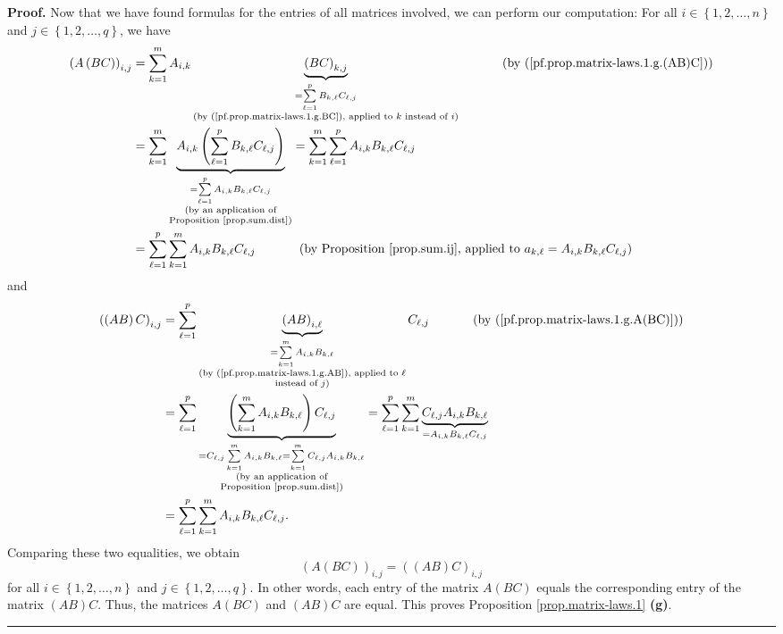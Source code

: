 \documentclass[numbers=enddot,12pt,final,onecolumn,notitlepage]{scrartcl}%
\theoremstyle{definition}
\newenvironment{proof}[1][Proof]{\noindent\textbf{#1.} }{\ \rule{0.5em}{0.5em}}
\let\sumnonlimits\sum
\renewcommand{\sum}{\sumnonlimits\limits}
\begin{document}
\begin{proof}
Now that we have found formulas for the entries of all matrices involved, we
can perform our computation: For all $i\in\left\{  1,2,\ldots,n\right\}  $ and
$j\in\left\{  1,2,\ldots,q\right\}  $, we have%
\begin{align*}
\left(  A\left(  BC\right)  \right)  _{i,j}  &  =\sum_{k=1}^{m}A_{i,k}%
\underbrace{\left(  BC\right)  _{k,j}}_{\substack{=\sum_{\ell=1}^{p}B_{k,\ell
}C_{\ell,j}\\\text{(by (\ref{pf.prop.matrix-laws.1.g.BC}), applied to }k\text{
instead of }i\text{)}}}\ \ \ \ \ \ \ \ \ \ \left(  \text{by
(\ref{pf.prop.matrix-laws.1.g.(AB)C})}\right) \\
&  =\sum_{k=1}^{m}\underbrace{A_{i,k}\left(  \sum_{\ell=1}^{p}B_{k,\ell
}C_{\ell,j}\right)  }_{\substack{=\sum_{\ell=1}^{p}A_{i,k}B_{k,\ell}C_{\ell
,j}\\\text{(by an application of}\\\text{Proposition \ref{prop.sum.dist})}%
}}=\sum_{k=1}^{m}\sum_{\ell=1}^{p}A_{i,k}B_{k,\ell}C_{\ell,j}\\
&  =\sum_{\ell=1}^{p}\sum_{k=1}^{m}A_{i,k}B_{k,\ell}C_{\ell,j}%
\ \ \ \ \ \ \ \ \ \ \left(  \text{by Proposition \ref{prop.sum.ij}, applied to
}a_{k,\ell}=A_{i,k}B_{k,\ell}C_{\ell,j}\right)
\end{align*}
and%
\begin{align*}
\left(  \left(  AB\right)  C\right)  _{i,j}  &  =\sum_{\ell=1}^{p}%
\underbrace{\left(  AB\right)  _{i,\ell}}_{\substack{=\sum_{k=1}^{m}%
A_{i,k}B_{k,\ell}\\\text{(by (\ref{pf.prop.matrix-laws.1.g.AB}), applied to
}\ell\\\text{instead of }j\text{)}}}C_{\ell,j}\ \ \ \ \ \ \ \ \ \ \left(
\text{by (\ref{pf.prop.matrix-laws.1.g.A(BC)})}\right) \\
&  =\sum_{\ell=1}^{p}\underbrace{\left(  \sum_{k=1}^{m}A_{i,k}B_{k,\ell
}\right)  C_{\ell,j}}_{\substack{=C_{\ell,j}\sum_{k=1}^{m}A_{i,k}B_{k,\ell
}=\sum_{k=1}^{m}C_{\ell,j}A_{i,k}B_{k,\ell}\\\text{(by an application
of}\\\text{Proposition \ref{prop.sum.dist})}}}=\sum_{\ell=1}^{p}\sum_{k=1}%
^{m}\underbrace{C_{\ell,j}A_{i,k}B_{k,\ell}}_{=A_{i,k}B_{k,\ell}C_{\ell,j}}\\
&  =\sum_{\ell=1}^{p}\sum_{k=1}^{m}A_{i,k}B_{k,\ell}C_{\ell,j}.
\end{align*}
Comparing these two equalities, we obtain
\[
\left(  A\left(  BC\right)  \right)  _{i,j}=\left(  \left(  AB\right)
C\right)  _{i,j}%
\]
for all $i\in\left\{  1,2,\ldots,n\right\}  $ and $j\in\left\{  1,2,\ldots
,q\right\}  $. In other words, each entry of the matrix $A\left(  BC\right)  $
equals the corresponding entry of the matrix $\left(  AB\right)  C$. Thus, the
matrices $A\left(  BC\right)  $ and $\left(  AB\right)  C$ are equal. This
proves Proposition \ref{prop.matrix-laws.1} \textbf{(g)}.
\end{proof}
\end{document}
